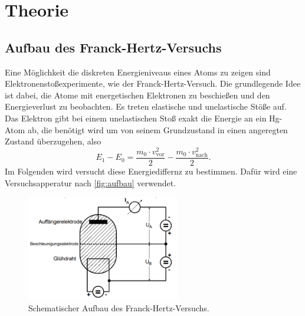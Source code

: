 \section{Theorie}
\label{sec:Theorie}




\subsection{Aufbau des Franck-Hertz-Versuchs}
\label{ssec:aufbau}

Eine Möglichkeit die diskreten Energieniveaus eines Atoms zu zeigen sind Elektronenstoßexperimente, wie der Franck-Hertz-Versuch.
Die grundlegende Idee ist dabei, die Atome mit energetischen Elektronen zu beschießen und den Energieverlust zu beobachten. 
Es treten elastische und unelastische Stöße auf.
Das Elektron gibt bei einem unelastischen Stoß exakt die Energie an ein Hg-Atom ab, die benötigt wird  um von seinem Grundzustand in einen angeregten Zustand überzugehen, also 
\begin{equation}
    E_1 - E_0 = \frac{m_0 \cdot v^2_\text{vor}}{2} - \frac{m_0 \cdot v^2_\text{nach}}{2}.
    \label{eq:energiedif}
\end{equation}
Im Folgenden wird versucht diese Energiediffernz zu bestimmen.
Dafür wird eine Versuchsapperatur nach \autoref{fig:aufbau} verwendet.

\begin{figure}
    \centering
    \includegraphics[width=0.6\textwidth]{images/bild1.png}
    \caption{Schematischer Aufbau des Franck-Hertz-Versuchs.\cite{V601}}
    \label{fig:aufbau}
\end{figure}

